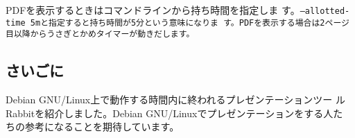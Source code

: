 \documentclass[mingoth,a4paper]{jsarticle}
\begin{document}
PDFを表示するときはコマンドラインから持ち時間を指定しま
す。\tt{--allotted-time 5m}と指定すると持ち時間が5分という意味になりま
す。PDFを表示する場合は2ページ目以降からうさぎとかめタイマーが動きだします。

\begin{commandline}
\end{commandline}

\subsection{さいごに}

Debian GNU/Linux上で動作する時間内に終われるプレゼンテーションツー
ルRabbitを紹介しました。Debian GNU/Linuxでプレゼンテーションをする人た
ちの参考になることを期待しています。
\end{document}
